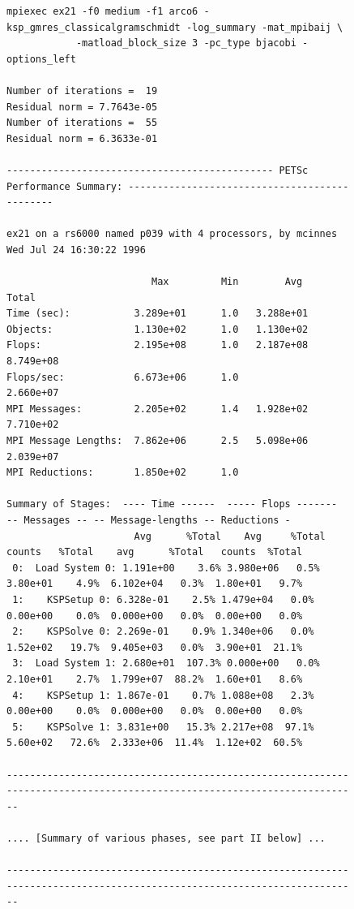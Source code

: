 \begin{figure}[tb]
{\tiny
\begin{verbatim}
mpiexec ex21 -f0 medium -f1 arco6 -ksp_gmres_classicalgramschmidt -log_summary -mat_mpibaij \
            -matload_block_size 3 -pc_type bjacobi -options_left

Number of iterations =  19
Residual norm = 7.7643e-05
Number of iterations =  55
Residual norm = 6.3633e-01

---------------------------------------------- PETSc Performance Summary: ----------------------------------------------

ex21 on a rs6000 named p039 with 4 processors, by mcinnes Wed Jul 24 16:30:22 1996

                         Max         Min        Avg        Total 
Time (sec):           3.289e+01      1.0   3.288e+01
Objects:              1.130e+02      1.0   1.130e+02
Flops:                2.195e+08      1.0   2.187e+08   8.749e+08
Flops/sec:            6.673e+06      1.0               2.660e+07
MPI Messages:         2.205e+02      1.4   1.928e+02   7.710e+02
MPI Message Lengths:  7.862e+06      2.5   5.098e+06   2.039e+07
MPI Reductions:       1.850e+02      1.0

Summary of Stages:  ---- Time ------  ----- Flops -------  -- Messages -- -- Message-lengths -- Reductions -
                      Avg      %Total    Avg     %Total   counts   %Total    avg      %Total   counts  %Total 
 0:  Load System 0: 1.191e+00    3.6% 3.980e+06   0.5%  3.80e+01    4.9%  6.102e+04   0.3%  1.80e+01   9.7% 
 1:    KSPSetup 0: 6.328e-01    2.5% 1.479e+04   0.0%  0.00e+00    0.0%  0.000e+00   0.0%  0.00e+00   0.0% 
 2:    KSPSolve 0: 2.269e-01    0.9% 1.340e+06   0.0%  1.52e+02   19.7%  9.405e+03   0.0%  3.90e+01  21.1% 
 3:  Load System 1: 2.680e+01  107.3% 0.000e+00   0.0%  2.10e+01    2.7%  1.799e+07  88.2%  1.60e+01   8.6% 
 4:    KSPSetup 1: 1.867e-01    0.7% 1.088e+08   2.3%  0.00e+00    0.0%  0.000e+00   0.0%  0.00e+00   0.0% 
 5:    KSPSolve 1: 3.831e+00   15.3% 2.217e+08  97.1%  5.60e+02   72.6%  2.333e+06  11.4%  1.12e+02  60.5% 

------------------------------------------------------------------------------------------------------------------------

.... [Summary of various phases, see part II below] ...

------------------------------------------------------------------------------------------------------------------------


\end{verbatim}}
\end{figure}

